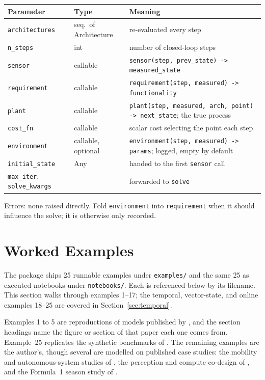 \documentclass[11pt,a4paper]{article}
\begin{document}
\begin{center}
\begin{tabular}{@{}llp{}@{}}
\toprule
Parameter & Type & Meaning \\
\midrule
\texttt{architectures} & seq.\ of Architecture & re-evaluated every step \\
\texttt{n\_steps} & int & number of closed-loop steps \\
\texttt{sensor} & callable & \texttt{sensor(step, prev\_state) ->
  measured\_state} \\
\texttt{requirement} & callable & \texttt{requirement(step, measured) ->
  functionality} \\
\texttt{plant} & callable & \texttt{plant(step, measured, arch, point) ->
  next\_state}; the true process \\
\texttt{cost\_fn} & callable & scalar cost selecting the point each step \\
\texttt{environment} & callable, optional & \texttt{environment(step,
  measured) -> params}; logged, empty by default \\
\texttt{initial\_state} & Any & handed to the first \texttt{sensor} call \\
\texttt{max\_iter}, \texttt{solve\_kwargs} & & forwarded to \texttt{solve} \\
\bottomrule
\end{tabular}
\end{center}
Errors: none raised directly. Fold \texttt{environment} into
\texttt{requirement} when it should influence the solve; it is otherwise only
recorded.

\section{Worked Examples}
\label{sec:examples}

The package ships 25 runnable examples under \texttt{examples/} and the
same 25 as executed notebooks under \texttt{notebooks/}. Each is
referenced below by its filename. This section walks through examples
1--17; the temporal, vector-state, and online examples 18--25 are covered
in Section~\ref{sec:temporal}.

Examples 1 to 5 are reproductions of models published by
\citet{censi2015mathematical}, and the section headings name the figure
or section of that paper each one comes from. Example~25 replicates the
synthetic benchmarks of \citet{alharbi2026online}. The remaining
examples are the author's, though several are modelled on published
case studies: the mobility and autonomous-system studies of
\citet{zardini2020avmobility,zardini2021autonomous,zardini2022taskdriven},
the perception and compute co-design of \citet{milojevic2025codei}, and
the Formula~1 season study of \citet{neumann2025formula1}.
\end{document}
